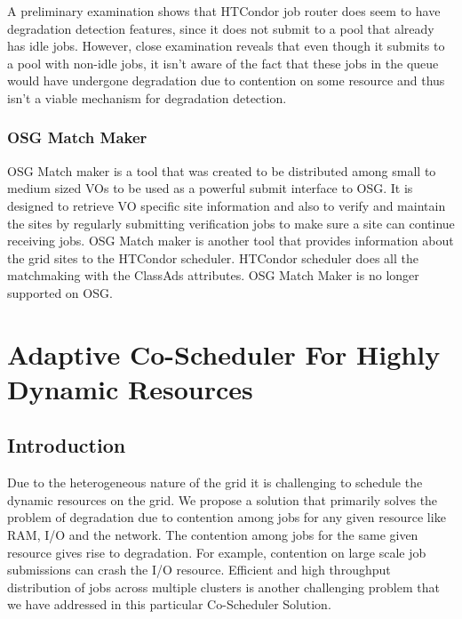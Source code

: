 \documentclass[ms,electronic,double]{nuthesis}
\begin{document}
A preliminary examination shows that HTCondor job router does seem to have degradation detection features, 
since it does not submit to a pool that already has idle jobs. However, close examination reveals that even though it
submits to a pool with non-idle jobs, it isn't aware of the fact that these jobs in the queue would have 
undergone degradation due to contention on some resource and thus isn't a viable mechanism for degradation detection.

\subsection{OSG Match Maker}

OSG Match maker is a tool that was created to be distributed among small to 
medium sized VOs to be used as a powerful submit interface to OSG. It is 
designed to retrieve VO specific site information and also to verify and 
maintain the sites by regularly submitting verification jobs to make sure a site 
can continue receiving jobs.
OSG Match maker is another tool that provides information about the grid sites to the 
HTCondor scheduler. HTCondor scheduler does all the matchmaking with the ClassAds attributes. 
OSG Match Maker is no longer supported on OSG.
  

\chapter{Adaptive Co-Scheduler For Highly Dynamic Resources}

\section{Introduction}
Due to the heterogeneous nature of the grid it is challenging to schedule the dynamic resources on the grid. 
We propose a solution that primarily solves the problem of degradation due to contention among 
jobs for any given resource like RAM, I/O and the network. The contention among jobs for the same given
resource gives rise to degradation. For example, contention on large scale job submissions can crash the I/O resource.
 Efficient and high throughput
distribution of jobs across multiple clusters is another challenging problem that we have addressed in 
this particular Co-Scheduler Solution. 
\end{document}
